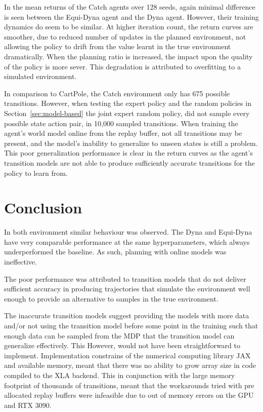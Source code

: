 In the mean returns of the Catch agents over 128 seeds, again minimal difference is seen between the Equi-Dyna agent and the Dyna agent. However, their training dynamics do seem to be similar. At higher iteration count, the return curves are smoother, due to reduced number of updates in the planned environment, not allowing the policy to drift from the value learnt in the true environment dramatically. When the planning ratio is increased, the impact upon the quality of the policy is more sever. This degradation is attributed to overfitting to a simulated environment.

In comparison to CartPole, the Catch environment only has 675 possible transitions. However, when testing the expert policy and the random policies in Section~\ref{sec:model-based} the joint expert random policy, did not sample every possible state action pair, in 10,000 sampled transitions. When training the agent's world model online from the replay buffer, not all transitions may be present, and the model's inability to generalize to unseen states is still a problem. This poor generalization performance is clear in the return curves as the agent's transition models are not able to produce sufficiently accurate transitions for the policy to learn from.


\section{Conclusion}
In both environment similar behaviour was observed. The Dyna and Equi-Dyna have very comparable performance at the same hyperparameters, which always underperformed the baseline. As such, planning with online models was ineffective.

The poor performance was attributed to transition models that do not deliver sufficient accuracy in producing trajectories that simulate the environment well enough to provide an alternative to samples in the true environment.

The inaccurate transition models suggest providing the models with more data and/or not using the transition model before some point in the training such that enough data can be sampled from the MDP that the transition model can generalize effectively. This However, would not have been straightforward to implement. Implementation constrains of the numerical computing library JAX and available memory, meant that there was no ability to grow array size in code compiled to the XLA backend. This in conjunction with the large memory footprint of thousands of transitions, meant that the workarounds tried with pre allocated replay buffers were infeasible due to out of memory errors on the GPU and RTX 3090.

